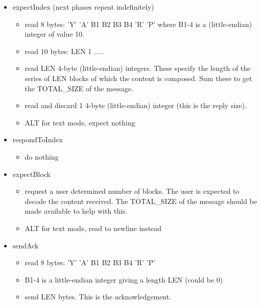 \documentclass[a4]{article}
\begin{document}
\begin{itemize}
\item expectIndex (next phases repeat indefinitely)
  \begin{itemize}
  \item read 8 bytes: 'Y' 'A' B1 B2 B3 B4 'R' 'P' where B1-4 is a 
    (little-endian) integer of value 10.
  \item read 10 bytes: LEN 1 .....
  \item read LEN 4-byte (little-endian) integers.  These specify
    the length of the series of LEN blocks of which the
    content is composed.  Sum these to get the TOTAL\_SIZE of the 
    message.
  \item read and discard 1 4-byte (little-endian) integer (this is
    the reply size).
  \item ALT for text mode, expect nothing
  \end{itemize}

\item respondToIndex
  \begin{itemize}
  \item do nothing
  \end{itemize}

\item expectBlock
  \begin{itemize}
  \item request a user determined number of blocks.  The user
    is expected to decode the content received.  The TOTAL\_SIZE
    of the message should be made available to help with this.
  \item ALT for text mode, read to newline instead
  \end{itemize}

\item sendAck
  \begin{itemize}
  \item read 8 bytes: 'Y' 'A' B1 B2 B3 B4 'R' 'P'
  \item B1-4 is a little-endian integer giving a length LEN (could be 0)
  \item send LEN bytes.  This is the acknowledgement.
  \end{itemize}
\end{itemize}




\end{document}
